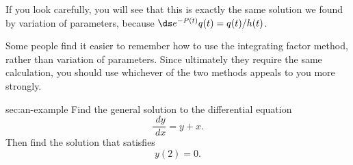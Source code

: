 If you look carefully, you will see that this is exactly the same
solution we found by variation of parameters, because
$\ds e^{-P(t)}q(t)=q(t)/h(t)$.

Some people find it easier to remember how to use the integrating
factor method, rather than variation of parameters. Since ultimately they
require the same calculation, you should use whichever of the two methods
appeals to you more strongly. 





\begin{example}{}{sec:an-example}
Find the general solution to the differential equation
\[
\frac{\; d y} {\; d x} = y + x.
\]
Then find the solution that satisfies \upshape
\begin{equation}
  y(2)=0.
  \label{eq:example-linear-initial-condition}
\end{equation}
\end{example}


